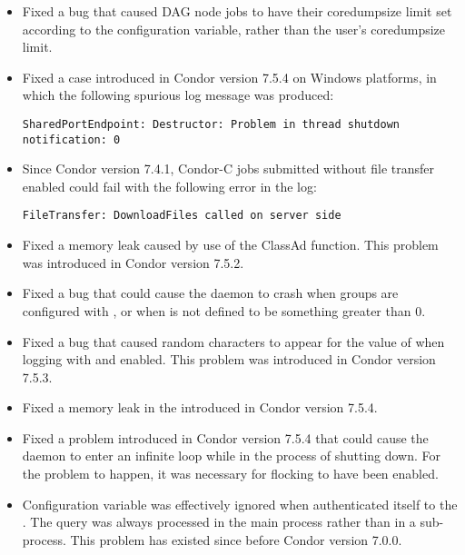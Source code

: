 \begin{itemize}
\item Fixed a bug that caused DAG node jobs to have their coredumpsize
limit set according to the  configuration
variable, rather than the user's coredumpsize limit.

\item Fixed a case introduced in Condor version 7.5.4 on Windows platforms,
in which the following spurious log message was produced:
\begin{verbatim}
SharedPortEndpoint: Destructor: Problem in thread shutdown notification: 0
\end{verbatim}

\item Since Condor version 7.4.1,
Condor-C jobs submitted without file transfer enabled could
fail with the following error in the  log:
\begin{verbatim}
FileTransfer: DownloadFiles called on server side
\end{verbatim}

\item Fixed a memory leak caused by use of the ClassAd 
  function.  This problem was introduced in Condor version 7.5.2.

\item Fixed a bug that could cause the  daemon to
  crash when groups are configured with
  , or when
   is not defined to be something
  greater than 0.

\item Fixed a bug that caused random characters to appear for the
  value of  when logging with 
  and  enabled.
  This problem was introduced in Condor version 7.5.3.

\item Fixed a memory leak in the   
introduced in Condor version 7.5.4.

\item Fixed a problem introduced in Condor version 7.5.4 that could cause the
   daemon to enter an infinite loop while in the
  process of shutting down.  For the problem to happen, it was
  necessary for flocking to have been enabled.

\item Configuration variable  was effectively 
  ignored when  authenticated itself to the .
  The query was always
  processed in the main  process rather than in a sub-process.
  This problem has existed since before Condor version 7.0.0.


\end{itemize}
